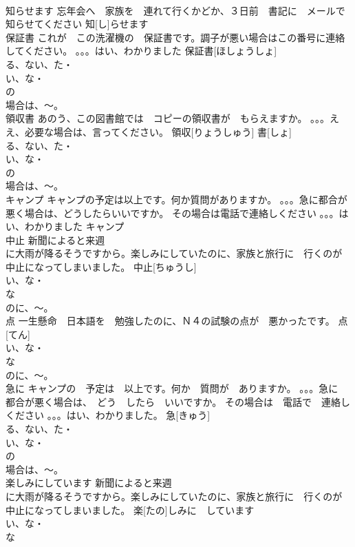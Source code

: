 \documentclass[8pt]{extreport}
\begin{document}
\begin{CJK}{UTF8}{min}
\\	知らせます	忘年会へ　家族を　連れて行くかどか、３日前　書記に　メールで　知らせてください	知[し]らせます					
\\	保証書	これが　この洗濯機の　保証書です。調子が悪い場合はこの番号に連絡してください。 。。。はい、わかりました	保証書[ほしょうしょ]			
\\	る、ない、た・
\\	い、な・
\\	の
\\	場合は、～。
\\	領収書	あのう、この図書館では　コピーの領収書が　もらえますか。 。。。ええ、必要な場合は、言ってください。	領収[りょうしゅう] 書[しょ]			
\\	る、ない、た・
\\	い、な・
\\	の
\\	場合は、～。
\\	キャンプ	キャンプの予定は以上です。何か質問がありますか。 。。。急に都合が悪く場合は、どうしたらいいですか。 その場合は電話で連絡しください 。。。はい、わかりました	キャンプ					
\\	中止	新聞によると来週
\\	に大雨が降るそうですから。楽しみにしていたのに、家族と旅行に　行くのが　中止になってしまいました。	中止[ちゅうし]			
\\	い、な・
\\	な
\\	のに、～。
\\	点	一生懸命　日本語を　勉強したのに、Ｎ４の試験の点が　悪かったです。	点[てん]			
\\	い、な・
\\	な
\\	のに、～。
\\	急に	キャンプの　予定は　以上です。何か　質問が　ありますか。 。。。急に　都合が悪く場合は、　どう　したら　いいですか。 その場合は　電話で　連絡し　ください 。。。はい、わかりました。	急[きゅう]			
\\	る、ない、た・
\\	い、な・
\\	の
\\	場合は、～。
\\	楽しみにしています	新聞によると来週
\\	に大雨が降るそうですから。楽しみにしていたのに、家族と旅行に　行くのが　中止になってしまいました。	楽[たの]しみに　しています			
\\	い、な・
\\	な

\end{CJK}
\end{document}
